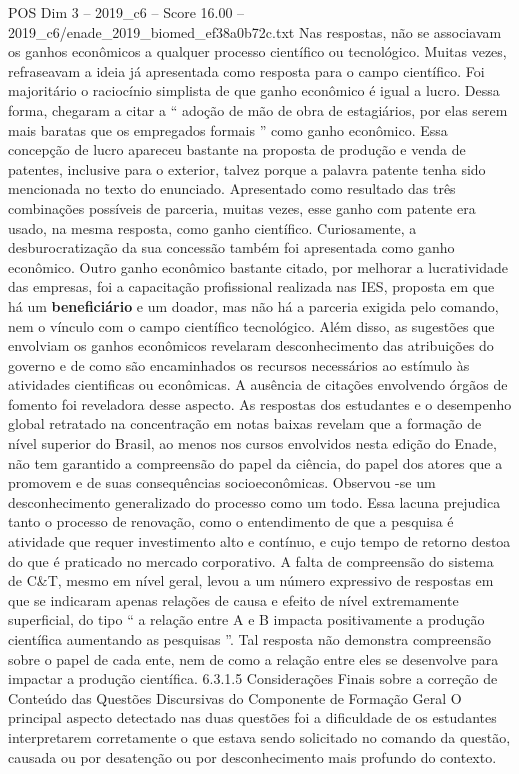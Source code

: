 \begin{textsample}{POS Dim 3 – 2019\_c6 – Score 16.00 – 2019\_c6/enade\_2019\_biomed\_ef38a0b72c.txt}
Nas respostas, não se associavam os ganhos econômicos a qualquer processo científico ou tecnológico.
Muitas vezes, refraseavam a ideia já apresentada como resposta para o campo científico.
Foi majoritário o raciocínio simplista de que ganho econômico é igual a lucro.
Dessa forma, chegaram a citar a “ adoção de mão de obra de estagiários, por elas serem mais baratas que os empregados formais ” como ganho econômico.
Essa concepção de lucro apareceu bastante na proposta de produção e venda de patentes, inclusive para o exterior, talvez porque a palavra patente tenha sido mencionada no texto do enunciado.
Apresentado como resultado das três combinações possíveis de parceria, muitas vezes, esse ganho com patente era usado, na mesma resposta, como ganho científico.
Curiosamente, a desburocratização da sua concessão também foi apresentada como ganho econômico.
Outro ganho econômico bastante citado, por melhorar a lucratividade das empresas, foi a capacitação profissional realizada nas IES, proposta em que há um \textbf{beneficiário} e um doador, mas não há a parceria exigida pelo comando, nem o vínculo com o campo científico tecnológico.
Além disso, as sugestões que envolviam os ganhos econômicos revelaram desconhecimento das atribuições do governo e de como são encaminhados os recursos necessários ao estímulo às atividades cientificas ou econômicas.
A ausência de citações envolvendo órgãos de fomento foi reveladora desse aspecto.
As respostas dos estudantes e o desempenho global retratado na concentração em notas baixas revelam que a formação de nível superior do Brasil, ao menos nos cursos envolvidos nesta edição do Enade, não tem garantido a compreensão do papel da ciência, do papel dos atores que a promovem e de suas consequências socioeconômicas.
Observou -se um desconhecimento generalizado do processo como um todo.
Essa lacuna prejudica tanto o processo de renovação, como o entendimento de que a pesquisa é atividade que requer investimento alto e contínuo, e cujo tempo de retorno destoa do que é praticado no mercado corporativo.
A falta de compreensão do sistema de C\&T, mesmo em nível geral, levou a um número expressivo de respostas em que se indicaram apenas relações de causa e efeito de nível extremamente superficial, do tipo “ a relação entre A e B impacta positivamente a produção científica aumentando as pesquisas ”.
Tal resposta não demonstra compreensão sobre o papel de cada ente, nem de como a relação entre eles se desenvolve para impactar a produção científica. 6.3.1.5 Considerações Finais sobre a correção de Conteúdo das Questões Discursivas do Componente de Formação Geral O principal aspecto detectado nas duas questões foi a dificuldade de os estudantes interpretarem corretamente o que estava sendo solicitado no comando da questão, causada ou por desatenção ou por desconhecimento mais profundo do contexto.

\end{textsample}
